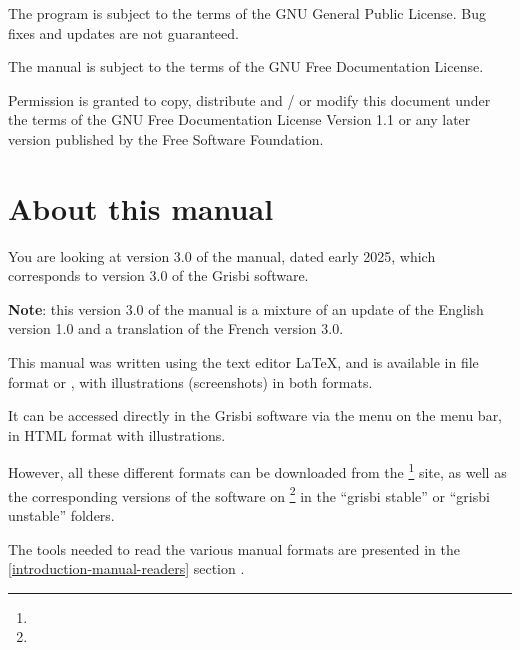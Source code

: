 The program is subject to the terms of the \gls{GNU General Public License}.  Bug fixes and updates are not guaranteed.

The manual is subject to the terms of the \gls{GNU Free Documentation License}.

Permission is granted to copy, distribute and / or modify this document under the terms of the GNU Free Documentation License Version 1.1 or any later version published by the Free Software Foundation.

\section{About this manual \label{introduction-manual}}

You are looking at version \actuality{}3.0 of the manual, dated \actuality{} early 2025, which corresponds to version 3.0 of the Grisbi software.


\textbf{Note}: this version 3.0 of the manual is a mixture of an update of the English version 1.0 and a translation of the French version 3.0.


This manual was written using the \gls{text editor} \gls{LaTeX}, and is available in \gls{file format}  or , with illustrations (screenshots) in both formats.


It can be accessed directly in the Grisbi software via the  menu on the menu bar, in \gls{HTML} format with illustrations.


However, all these different formats can be downloaded from the \footnote{\urlSourceForgeDocumentation{}} site, as well as the corresponding versions of the software on \footnote{\urlSourceForge{}} in the ``\textsf{grisbi stable}'' or ``\textsf{grisbi unstable}'' folders.


The tools needed to read the various manual formats are presented in the  \vref{introduction-manual-readers} section .


